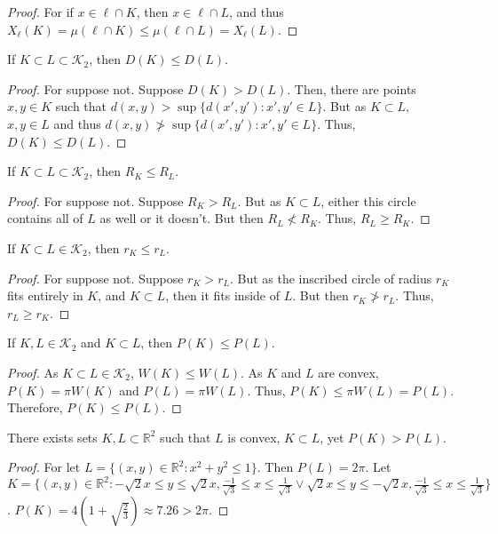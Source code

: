         \begin{proof}
        For if $x\in \ell\cap K$, then $x\in \ell\cap L$, and thus $X_{\ell}(K)=\mu(\ell\cap K) \leq \mu(\ell\cap L)=X_{\ell}(L)$.
        \end{proof}
        \begin{theorem}
        If $K\subset L\subset \mathscr{K}_2$, then $D(K)\leq D(L)$.
        \end{theorem}
        \begin{proof}
        For suppose not. Suppose $D(K)>D(L)$. Then, there are points $x,y\in K$ such that $d(x,y)> \sup\{d(x',y'):x',y'\in L\}$. But as $K\subset L$, $x,y\in L$ and thus $d(x,y) \not> \sup\{d(x',y'):x',y'\in L\}$. Thus, $D(K)\leq D(L)$.
        \end{proof}
        \begin{theorem}
        If $K\subset L \subset \mathscr{K}_2$, then $R_K\leq R_L$.
        \end{theorem}
        \begin{proof}
        For suppose not. Suppose $R_K>R_L$. But as $K\subset L$, either this circle contains all of $L$ as well or it doesn't. But then $R_L \not<R_K$. Thus, $R_L\geq R_K$.
        \end{proof}
        \begin{theorem}
        If $K\subset L \in \mathscr{K}_2$, then $r_K \leq r_L$.
        \end{theorem}
        \begin{proof}
        For suppose not. Suppose $r_K> r_L$. But as the inscribed circle of radius $r_K$ fits entirely in $K$, and $K\subset L$, then it fits inside of $L$. But then $r_K \not > r_L$. Thus, $r_L \geq r_K$.
        \end{proof}
        \begin{theorem}
        If $K,L\in \mathscr{K}_2$ and $K\subset L$, then $P(K)\leq P(L)$.
        \end{theorem}
        \begin{proof}
        As $K\subset L\in  \mathscr{K}_2$, $W(K)\leq W(L)$. As $K$ and $L$ are convex, $P(K)=\pi W(K)$ and $P(L)=\pi W(L)$. Thus, $P(K) \leq \pi W(L) = P(L)$. Therefore, $P(K)\leq P(L)$.
        \end{proof}
        \begin{theorem}
        There exists sets $K,L\subset \mathbb{R}^2$ such that $L$ is convex, $K\subset L$, yet $P(K)>P(L)$.
        \end{theorem}
        \begin{proof}
        For let $L = \{(x,y)\in \mathbb{R}^2: x^2 + y^2 \leq 1\}$. Then $P(L) = 2\pi$. Let $K = \{(x,y)\in \mathbb{R}^2: -\sqrt{2}x\leq y \leq \sqrt{2}x,\frac{-1}{\sqrt{3}} \leq x \leq \frac{1}{\sqrt{3}} \lor \sqrt{2}x\leq y \leq -\sqrt{2}x,\frac{-1}{\sqrt{3}} \leq x \leq \frac{1}{\sqrt{3}} \}$. $P(K) = 4(1+ \sqrt{\frac{2}{3}}) \approx 7.26>2\pi$.
        \end{proof}
